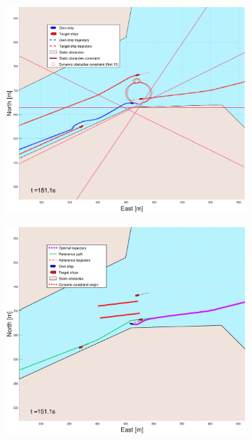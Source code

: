 \begin{figure}[!b]
\begin{subfigure}[b]{0.499\textwidth}
    \end{subfigure}
    \hfill
    \\
    \begin{subfigure}[b]{0.49\textwidth}
        \centering
        \includegraphics[width=\textwidth]{Images/Figures/Trheimfjord/_Simple_1fig1_time=151}
    \end{subfigure}
    \hfill
    \begin{subfigure}[b]{0.499\textwidth}
        \centering
        \includegraphics[width=\textwidth]{Images/Figures/Trheimfjord/_Simple_1fig999_time=151}
    \end{subfigure}
    \hfill
\end{figure}%
